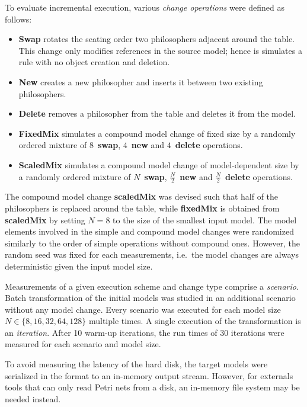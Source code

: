 To evaluate incremental execution, various \emph{change operations} were defined as follows:
\begin{itemize}
\item \textbf{Swap} rotates the seating order two philosophers adjacent around the table. This change only modifies references in the source model; hence is simulates a  rule with no object creation and deletion.
\item \textbf{New} creates a new philosopher and inserts it between two existing philosophers.
\item \textbf{Delete} removes a philosopher from the table and deletes it from the model.
\item \textbf{Fixed\-Mix} simulates a compound model change of fixed size by a randomly ordered mixture of \(8\)~\textbf{swap}, \(4\)~\textbf{new} and \(4\)~\textbf{delete} operations.
\item \textbf{Scaled\-Mix} simulates a compound model change of model-dependent size by a randomly ordered mixture of \(N\)~\textbf{swap}, \(\frac{N}{2}\)~\textbf{new} and \(\frac{N}{2}\)~\textbf{delete} operations.
\end{itemize}

The compound model change \textbf{scaled\-Mix} was devised such that half of the philosophers is replaced around the table, while \textbf{fixed\-Mix} is obtained from \textbf{scaled\-Mix} by setting \(N = 8\) to the size of the smallest input model. The model elements involved in the simple and compound model changes were randomized similarly to the order of simple operations without compound ones. However, the random seed was fixed for each measurements, i.e.~the model changes are always deterministic given the input model size.

Measurements of a given execution scheme and change type comprise a \emph{scenario}. Batch transformation of the initial models was studied in an additional scenario without any model change. Every scenario was executed for each model size \(N \in \{8, 16, 32, 64, 128\}\) multiple times. A single execution of the transformation is an \emph{iteration}. After 10 warm-up iterations, the run times of 30 iterations were measured for each scenario and model size.

To avoid measuring the latency of the hard disk, the target  models were serialized in the  format to an in-memory output stream. However, for externals tools that can only read Petri nets from a disk, an in-memory file system may be needed instead.

